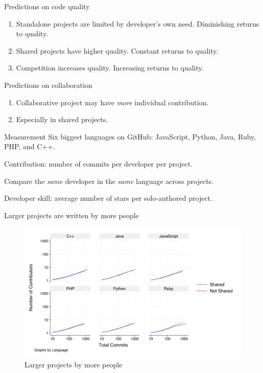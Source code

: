 \documentclass[
  ignorenonframetext,
  aspectratio=1610,
]{beamer}
\providecommand{\tightlist}{%
  \setlength{\itemsep}{0pt}\setlength{\parskip}{0pt}}
\begin{document}
\begin{frame}{Predictions on code quality}
\label{predictions-on-code-quality}
\begin{enumerate}
\tightlist
\item
  Standalone projects are limited by developer's own need. Diminishing
  returns to quality.
\item
  Shared projects have higher quality. Constant returns to quality.
\item
  Competition increases quality. Increasing returns to quality.
\end{enumerate}
\end{frame}

\begin{frame}{Predictions on collaboration}
\label{predictions-on-collaboration}
\begin{enumerate}
\tightlist
\item
  Collaborative project may have \emph{more} individual contribution.
\item
  Especially in shared projects.
\end{enumerate}
\end{frame}

\begin{frame}{Measurement}
\label{measurement}
Six biggest languages on GitHub: JavaScript, Python, Java, Ruby, PHP,
and C++.

Contribution: number of commits per developer per project.

Compare the \emph{same} developer in the \emph{same} language across
projects.

Developer skill: average number of stars per solo-authored project.
\end{frame}

\begin{frame}{Larger projects are written by more people}
\label{larger-projects-are-written-by-more-people}
\begin{figure}
\centering
\includegraphics{figures/n_contributors_by_commits.png}
\caption{Larger projects by more people}
\end{figure}
\end{frame}
\end{document}
